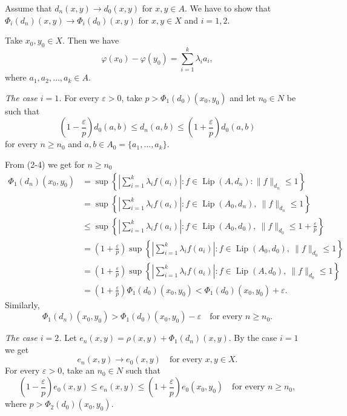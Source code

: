 \documentclass[11pt,a4paper,leqno,twoside]{article}
\newcommand{\Lip}{\operatorname{Lip}}
\newcommand{\norm}[1]{\lVert#1\rVert}
\begin{document}
Assume that $d_n(x,y)\to d_0(x,y)$ for $x,y\in A$. We have to show that $\Phi_i(d_n)(x,y)\to\Phi_i(d_0)(x,y)$ for $x,y\in X$ and $i=1,2$.

Take $x_0,y_0\in X$. Then we have
\[\varphi(x_0)-\varphi(y_0)=\sum_{i=1}^k\lambda_i a_i,\]
where $a_1,a_2,\ldots,a_k\in A$.

\textit{The case $i=1$.} For every $\varepsilon>0$, take $p>\Phi_1(d_0)(x_0,y_0)$ and let $n_0\in N$ be such that
\begin{equation}\tag{2-4}
\left(1-\frac\varepsilon p\right)d_0(a,b)\leq d_n(a,b)\leq\left(1+\frac\varepsilon p\right)d_0(a,b)
\end{equation}
for every $n\geq n_0$ and $a,b\in A_0=\{a_1,\ldots,a_k\}$.

From (2-4) we get for $n\geq n_0$
\[
\begin{aligned}
\Phi_1(d_n)(x_0,y_0)
&=\sup\left\{\left|\sum_{i=1}^k\lambda_i f(a_i)\right|:f\in\Lip(A,d_n):\norm f_{d_n}\leq1\right\}\\[5pt]
&=\sup\left\{\left|\sum_{i=1}^k\lambda_i f(a_i)\right|:f\in\Lip(A_0,d_n),\ \norm f_{d_n}\leq1\right\}\\[5pt]
&\leq\sup\left\{\left|\sum_{i=1}^k\lambda_i f(a_i)\right|:f\in\Lip(A_0,d_0),\ \norm f_{d_0}\leq1+\frac\varepsilon p\right\}\\[5pt]
&=\left(1+\frac\varepsilon p\right)\sup\left\{\left|\sum_{i=1}^k\lambda_i f(a_i)\right|:f\in\Lip(A_0,d_0),\ \norm f_{d_0}\leq1\right\}\\[5pt]
&=\left(1+\frac\varepsilon p\right)\sup\left\{\left|\sum_{i=1}^k\lambda_i f(a_i)\right|:f\in\Lip(A,d_0),\ \norm f_{d_0}\leq1\right\}\\[5pt]
&=\left(1+\frac\varepsilon p\right)\Phi_1(d_0)(x_0,y_0)<\Phi_1(d_0)(x_0,y_0)+\varepsilon.
\end{aligned}
\]
Similarly,
\[\Phi_1(d_n)(x_0,y_0)>\Phi_1(d_0)(x_0,y_0)-\varepsilon\quad\text{for every }n\geq n_0.\]

\newpage %
\textit{The case $i=2$.} Let $e_n(x,y)=\rho(x,y)+\Phi_1(d_n)(x,y)$. By the case $i=1$ we get
\[e_n(x,y)\to e_0(x,y)\quad\text{for every }x,y\in X.\]
For every $\varepsilon>0$, take an $n_0\in N$ such that
\begin{equation}\tag{2-5}
\left(1-\frac\varepsilon p\right)e_0(x,y)\leq e_n(x,y)\leq\left(1+\frac\varepsilon p\right)e_0(x_0,y_0)\quad\text{for every }n\geq n_0,
\end{equation}
where $p>\Phi_2(d_0)(x_0,y_0)$.
\end{document}
